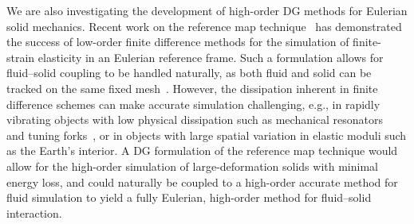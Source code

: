 We are also investigating the development of high-order DG methods for Eulerian solid mechanics. Recent work on the reference map technique~\cite{Kamrin_09_01,Kamrin_12_01,Levin_11_01} has demonstrated the success of low-order finite difference methods for the simulation of finite-strain elasticity in an Eulerian reference frame. Such a formulation allows for fluid--solid coupling to be handled naturally, as both fluid and solid can be tracked on the same fixed mesh~\cite{Valkov_15_01,Rycroft_20_01,Dunne_2013,Teng_16_01,Jain_19_01}. However, the dissipation inherent in finite difference schemes can make accurate simulation challenging, e.g., in rapidly vibrating objects with low physical dissipation such as mechanical resonators~\cite{Govindjee_12_01} and tuning forks~\cite{Froehle_14_01}, or in objects with large spatial variation in elastic moduli such as the Earth's interior. A DG formulation of the reference map technique would allow for the high-order simulation of large-deformation solids with minimal energy loss, and could naturally be coupled to a high-order accurate method for fluid simulation to yield a fully Eulerian, high-order method for fluid--solid interaction.

